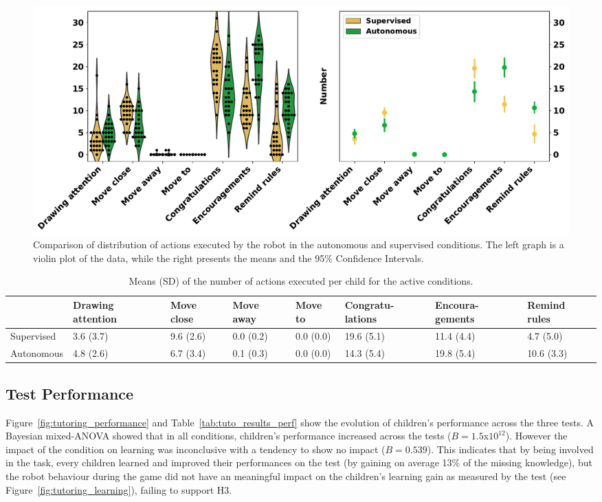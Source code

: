 \begin{figure}[ht]
	\includegraphics[width=1\linewidth]{actions.pdf}
	\centering
	\caption{Comparison of distribution of actions executed by the robot in the autonomous and supervised conditions. The left graph is a violin plot of the data, while the right presents the means and the 95\% Confidence Intervals.}
	\label{fig:tutoring_actions_distribution}
\end{figure}

\begin{table}[ht]
	\centering
	\caption{Means (SD) of the number of actions executed per child for the active conditions.}
	\label{tab:tuto_results_actions}
	\begin{tabularx}{\textwidth}{@{}L{1.3}L{1.1}L{.7}L{.7}L{.7}L{1.}L{1}L{.8}@{}}\toprule
 & Drawing attention & Move close & Move away & Move to & Congratu-lations & Encoura-gements & Remind rules\\ 
\midrule 
Supervised & 3.6 \hspace{.5cm} (3.7) & 9.6 (2.6) & 0.0 (0.2) & 0.0 (0.0) & 19.6 (5.1) & 11.4 (4.4) & 4.7 (5.0)\\ 
Autonomous & 4.8 \hspace{.5cm}(2.6) & 6.7 (3.4) & 0.1 (0.3) & 0.0 (0.0) & 14.3 (5.4) & 19.8 (5.4) & 10.6 (3.3)\\ 

		\bottomrule
	\end{tabularx}
\end{table}

\subsection{Test Performance}

Figure~\ref{fig:tutoring_performance} and Table~\ref{tab:tuto_results_perf} show the evolution of children's performance across the three tests. A Bayesian mixed-ANOVA showed that in all conditions, children's performance increased across the tests ($B=1.5$x$10^{12}$). However the impact of the condition on learning was inconclusive with a tendency to show no impact ($B=0.539$). This indicates that by being involved in the task, every children learned and improved their performances on the test (by gaining on average 13\% of the missing knowledge), but the robot behaviour during the game did not have an meaningful impact on the children's learning gain  as measured by the test (see Figure~\ref{fig:tutoring_learning}), failing to support H3.

